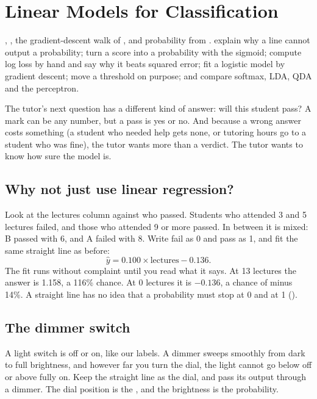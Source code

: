 \chapter{Linear Models for Classification}
\label{ch:classification}

\chapterguide%
  {, , the gradient-descent walk of , and probability from .}
  {explain why a line cannot output a probability; turn a score into a probability with the sigmoid; compute log loss by hand and say why it beats squared error; fit a logistic model by gradient descent; move a threshold on purpose; and compare softmax, LDA, QDA and the perceptron.}

The tutor's next question has a different kind of answer: will this student pass? A mark can be any number, but a pass is yes or no. And because a wrong answer costs something (a student who needed help gets none, or tutoring hours go to a student who was fine), the tutor wants more than a verdict. The tutor wants to know how sure the model is.

\section{Why not just use linear regression?}

Look at the lectures column against who passed. Students who attended 3 and 5 lectures failed, and those who attended 9 or more passed. In between it is mixed: B passed with 6, and A failed with 8. Write fail as 0 and pass as 1, and fit the same straight line as before:
\[
  \hat{y}=0.100\times\text{lectures}-0.136.
\]
The fit runs without complaint until you read what it says. At 13 lectures the answer is 1.158, a 116\% chance. At 0 lectures it is $-0.136$, a chance of minus 14\%. A straight line has no idea that a probability must stop at 0 and at 1 ().

\section{The dimmer switch}

\begin{analogy}
A light switch is off or on, like our labels. A dimmer sweeps smoothly from dark to full brightness, and however far you turn the dial, the light cannot go below off or above fully on. Keep the straight line as the dial, and pass its output through a dimmer. The dial position is the , and the brightness is the probability.
\end{analogy}


